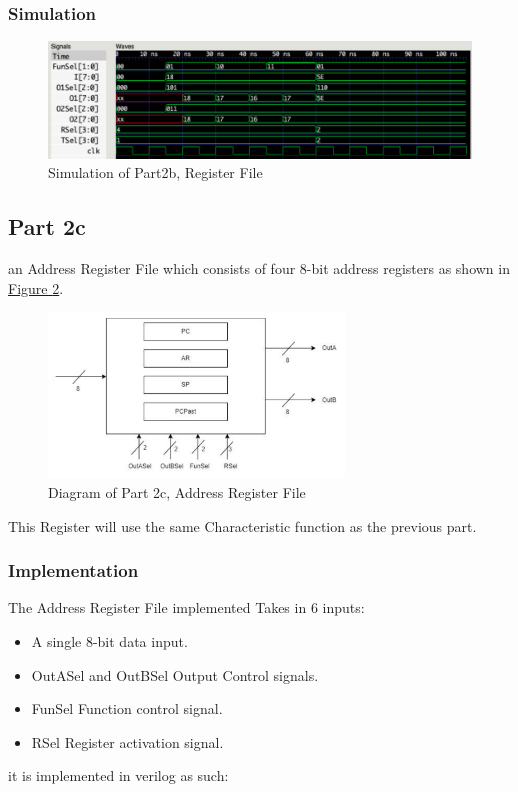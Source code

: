 \documentclass[pdftex,12pt,a4paper]{article}
\begin{document}
\subsubsection{Simulation}
\begin{figure}[H]
\centering
\includegraphics[width=1\textwidth]{part2b_sim.png}
\caption{Simulation of Part2b, Register File}
\label{fig:part2b_sim}
\end{figure}

\subsection{Part 2c}
an Address Register File which consists of four 8-bit address registers as shown in \hyperref[fig:part2c_diagram]{Figure \ref{fig:part2c_diagram}}.
\begin{figure}[H]
\centering
\includegraphics[width=0.7\textwidth]{part2c_diagram.png}
\caption{Diagram of Part 2c, Address Register File}
\label{fig:part2c_diagram}
\end{figure}
This Register will use the same Characteristic function as the previous part.

\subsubsection{Implementation}
The Address Register File implemented Takes in 6 inputs:
\begin{itemize}
\item A single 8-bit data input.
\item OutASel and OutBSel Output Control signals.
\item FunSel Function control signal.
\item RSel Register activation signal.
\end{itemize}
it is implemented in verilog as such:
\end{document}
